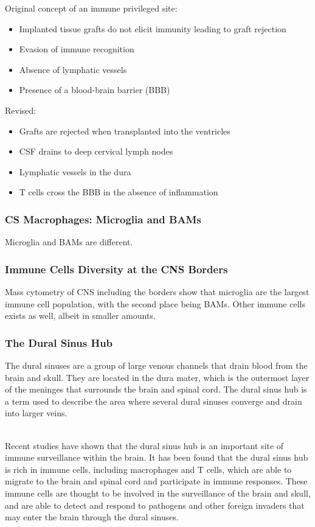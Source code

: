 \begin{itemize}
\begin{itemize}
Original concept of an immune privileged site:
\begin{itemize}
    \item  Implanted tissue grafts do not elicit
immunity leading to graft rejection
\item Evasion of immune recognition
\item Absence of lymphatic vessels
\item Presence of a blood-brain barrier (BBB)
\end{itemize}

Revised:
\begin{itemize}
    \item  Grafts are rejected when transplanted
into the ventricles
\item CSF drains to deep cervical lymph
nodes
\item Lymphatic vessels in the dura
\item T cells cross the BBB in the absence of
inflammation
\end{itemize}

\subsubsection{CS Macrophages: Microglia and BAMs}
Microglia and BAMs are different.


\subsubsection{Immune Cells Diversity at the CNS Borders}
Mass cytometry of CNS including the borders show that microglia are the largest immune cell population, with the second place being BAMs. Other immune cells exists as well, albeit in smaller amounts.

\subsubsection{The Dural Sinus Hub}
The dural sinuses are a group of large venous channels that drain blood from the brain and skull. They are located in the dura mater, which is the outermost layer of the meninges that surrounds the brain and spinal cord. The dural sinus hub is a term used to describe the area where several dural sinuses converge and drain into larger veins.

\\Recent studies have shown that the dural sinus hub is an important site of immune surveillance within the brain. It has been found that the dural sinus hub is rich in immune cells, including macrophages and T cells, which are able to migrate to the brain and spinal cord and participate in immune responses. These immune cells are thought to be involved in the surveillance of the brain and skull, and are able to detect and respond to pathogens and other foreign invaders that may enter the brain through the dural sinuses.


\end{itemize}
\end{itemize}
